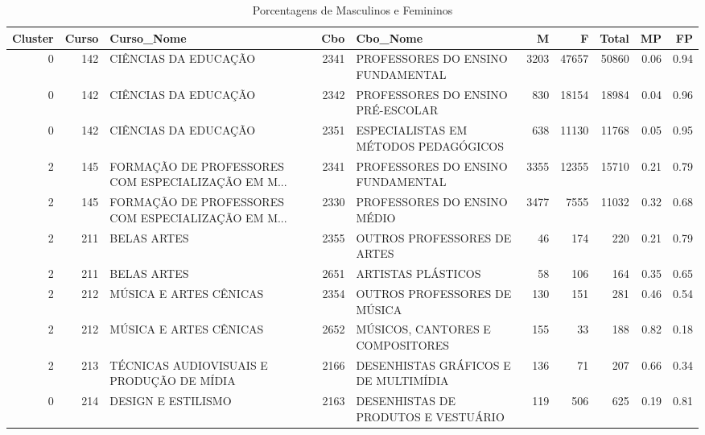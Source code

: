 \begin{table}
\centering
\caption{Porcentagens de Masculinos e Femininos}
\label{tab:Fem_Masc}
\begin{tabular}{rrlrlrrrrr}
\toprule
 Cluster &  Curso &                                         Curso\_Nome &  Cbo &                                           Cbo\_Nome &     M &     F &  Total &   MP &   FP \\
\midrule
       0 &    142 &                               CIÊNCIAS DA EDUCAÇÃO & 2341 &                  PROFESSORES DO ENSINO FUNDAMENTAL &  3203 & 47657 &  50860 & 0.06 & 0.94 \\
       0 &    142 &                               CIÊNCIAS DA EDUCAÇÃO & 2342 &                  PROFESSORES DO ENSINO PRÉ-ESCOLAR &   830 & 18154 &  18984 & 0.04 & 0.96 \\
       0 &    142 &                               CIÊNCIAS DA EDUCAÇÃO & 2351 &               ESPECIALISTAS EM MÉTODOS PEDAGÓGICOS &   638 & 11130 &  11768 & 0.05 & 0.95 \\
       2 &    145 & FORMAÇÃO DE PROFESSORES COM ESPECIALIZAÇÃO EM M... & 2341 &                  PROFESSORES DO ENSINO FUNDAMENTAL &  3355 & 12355 &  15710 & 0.21 & 0.79 \\
       2 &    145 & FORMAÇÃO DE PROFESSORES COM ESPECIALIZAÇÃO EM M... & 2330 &                        PROFESSORES DO ENSINO MÉDIO &  3477 &  7555 &  11032 & 0.32 & 0.68 \\
       2 &    211 &                                        BELAS ARTES & 2355 &                        OUTROS PROFESSORES DE ARTES &    46 &   174 &    220 & 0.21 & 0.79 \\
       2 &    211 &                                        BELAS ARTES & 2651 &                                 ARTISTAS PLÁSTICOS &    58 &   106 &    164 & 0.35 & 0.65 \\
       2 &    212 &                             MÚSICA E ARTES CÊNICAS & 2354 &                       OUTROS PROFESSORES DE MÚSICA &   130 &   151 &    281 & 0.46 & 0.54 \\
       2 &    212 &                             MÚSICA E ARTES CÊNICAS & 2652 &                   MÚSICOS, CANTORES E COMPOSITORES &   155 &    33 &    188 & 0.82 & 0.18 \\
       2 &    213 &          TÉCNICAS AUDIOVISUAIS E PRODUÇÃO DE MÍDIA & 2166 &               DESENHISTAS GRÁFICOS E DE MULTIMÍDIA &   136 &    71 &    207 & 0.66 & 0.34 \\
       0 &    214 &                                 DESIGN E ESTILISMO & 2163 &               DESENHISTAS DE PRODUTOS E  VESTUÁRIO &   119 &   506 &    625 & 0.19 & 0.81 \\

\end{tabular}
\end{table}
